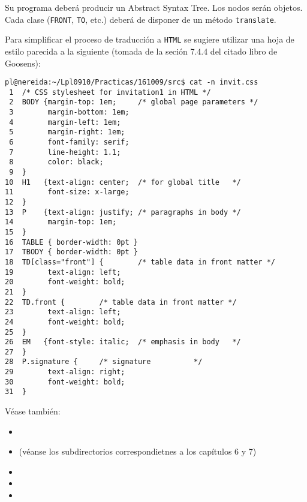 Su programa deberá producir un Abstract Syntax Tree.
Los nodos serán objetos. Cada clase (\verb|FRONT|, \verb|TO|, etc.)
deberá de disponer de un método \verb|translate|.

Para simplificar el proceso de traducción a \verb|HTML| se sugiere  utilizar una 
hoja de estilo parecida a la siguiente (tomada de la seción 7.4.4 del citado libro de Goosens):
\begin{verbatim}
pl@nereida:~/Lpl0910/Practicas/161009/src$ cat -n invit.css
 1  /* CSS stylesheet for invitation1 in HTML */
 2  BODY {margin-top: 1em;     /* global page parameters */
 3        margin-bottom: 1em;
 4        margin-left: 1em;
 5        margin-right: 1em;
 6        font-family: serif;
 7        line-height: 1.1;
 8        color: black;
 9  }
10  H1   {text-align: center;  /* for global title   */
11        font-size: x-large;
12  }
13  P    {text-align: justify; /* paragraphs in body */
14        margin-top: 1em;
15  }
16  TABLE { border-width: 0pt }
17  TBODY { border-width: 0pt }
18  TD[class="front"] {        /* table data in front matter */
19        text-align: left;
20        font-weight: bold;
21  }
22  TD.front {        /* table data in front matter */
23        text-align: left;
24        font-weight: bold;
25  }
26  EM   {font-style: italic;  /* emphasis in body   */
27  }
28  P.signature {     /* signature          */
29        text-align: right;
30        font-weight: bold;
31  }
\end{verbatim}

Véase también:

\begin{itemize}
\item
{}
\item
{} (véanse los subdirectorios
correspondietnes a los capítulos 6 y 7)
\item
{}
\item
{}
\item
{}
\end{itemize}


